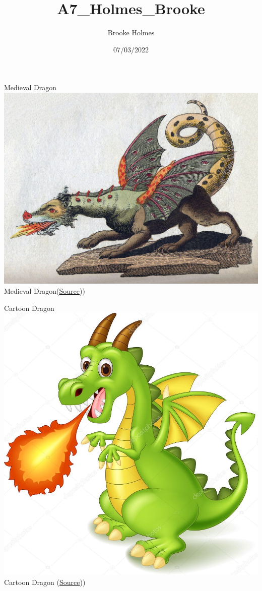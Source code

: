 \documentclass[
]{article}
\title{A7\_Holmes\_Brooke}
\author{Brooke Holmes}
\date{07/03/2022}
\begin{document}
\maketitle

Medieval Dragon \includegraphics{images/Dragon1.jpeg} Medieval
Dragon(\href{https://en.wikipedia.org/wiki/Dragon}{Source}))

Cartoon Dragon \includegraphics{images/Dragon2.jpeg}\\
Cartoon Dragon
(\href{https://www.istockphoto.com/vector/cartoon-dragon-posing-with-fire-gm486859494-73500809}{Source}))
\end{document}
